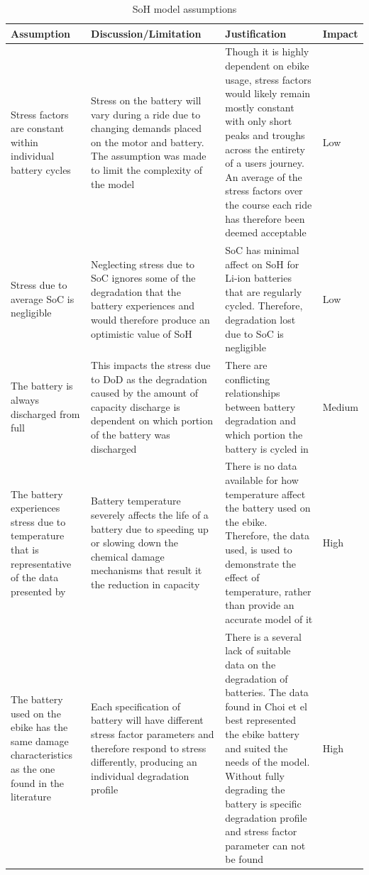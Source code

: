 \documentclass[a4paper, 10pt]{article}
\numberwithin{equation}{section}
\begin{document}
\begin{table}[H]
\caption{SoH model assumptions}
\label{table:SoHass}
\begin{tabular}{|P{0.2\textwidth}|P{0.3\textwidth}|P{0.3\textwidth}|P{0.1\textwidth}|}
\hline
\textbf{Assumption} & \textbf{Discussion/Limitation} & \textbf{Justification} & \textbf{Impact}
\\
\hline
Stress factors are constant within individual battery cycles & Stress on the battery will vary during a ride due to changing demands placed on the motor and battery. The assumption was made to limit the complexity of the model  & Though it is highly dependent on ebike usage, stress factors would likely remain mostly constant with only short peaks and troughs across the entirety of a users journey. An average of the stress factors over the course each ride has therefore been deemed acceptable & Low
\\
\hline
Stress due to average SoC is negligible  & Neglecting stress due to SoC ignores some of the degradation that the battery experiences and would therefore produce an optimistic value of SoH & SoC has minimal affect on SoH for Li-ion batteries that are regularly cycled. Therefore, degradation lost due to SoC is negligible & Low
\\
\hline
The battery is always discharged from full & This impacts the stress due to DoD as the degradation caused by the amount of capacity discharge is dependent on which portion of the battery was discharged & There are conflicting relationships between battery degradation and which portion the battery is cycled in \cite{report:cho}\cite{report:peterson} & Medium
\\
\hline
The battery experiences stress due to temperature that is representative of the data presented by \cite{web:batt_temp} & Battery temperature severely affects the life of a battery due to speeding up or slowing down the chemical damage mechanisms that result it the reduction in capacity & There is no data available for how temperature affect the battery used on the ebike. Therefore, the data used, is used to demonstrate the effect of temperature, rather than provide an accurate model of it & High
\\
\hline
The battery used on the ebike has the same damage characteristics as the one found in the literature \cite{report:cho} & Each specification of battery will have different stress factor parameters and therefore respond to stress differently, producing an individual degradation profile & There is a several lack of suitable data on the degradation of batteries. The data found in Choi et el best represented the ebike battery and suited the needs of the model. Without fully degrading the battery is specific degradation profile and stress factor parameter can not be found & High

\end{tabular}
\end{table}
\end{document}
